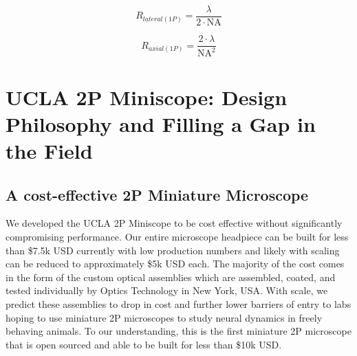 \documentclass [PhD] {UCLAthesis}
\begin{document}
\begin{equation}
    R_{lateral(1P)} = \frac{\lambda}{2 \cdot \text{NA}}
\end{equation}

\begin{equation}
    R_{axial(1P)} = \frac{2 \cdot \lambda}{\text{NA}^2}
\end{equation}


\chapter{UCLA 2P Miniscope: Design Philosophy and Filling a Gap in the Field}

\section{A cost-effective 2P Miniature Microscope}
We developed the UCLA 2P Miniscope to be cost effective without significantly compromising performance. Our entire microscope headpiece can be built for less than \$7.5k USD currently with low production numbers and likely with scaling can be reduced to approximately \$5k USD each. The majority of the cost comes in the form of the custom optical assemblies which are assembled, coated, and tested individually by Optics Technology in New York, USA. With scale, we predict these assemblies to drop in cost and further lower barriers of entry to labs hoping to use miniature 2P microscopes to study neural dynamics in freely behaving animals. To our understanding, this is the first miniature 2P microscope that is open sourced and able to be built for less than \$10k USD. 
\end{document}
